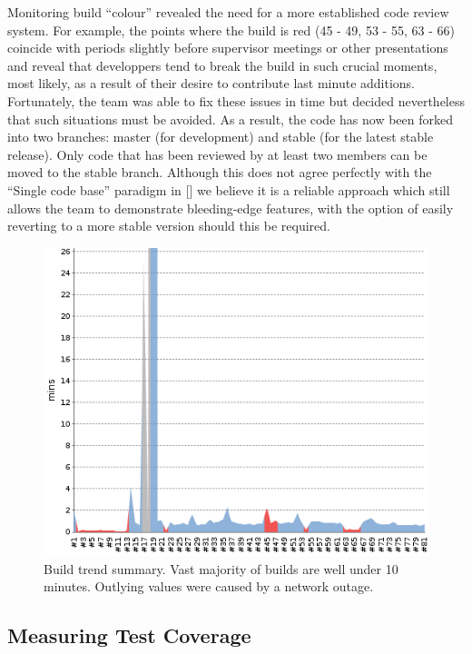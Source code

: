 \documentclass[10pt]{article}
\begin{document}
Monitoring build ``colour'' revealed the need for a more established code review system. For example, the points where the build is red (45 - 49, 53 - 55, 63 - 66) coincide with periods slightly before supervisor meetings or other presentations and reveal that developpers tend to break the build in such crucial moments, most likely, as a result of their desire to contribute last minute additions. Fortunately, the team was able to fix these issues in time but decided nevertheless that such situations must be avoided. As a result, the code has now been forked into two branches: master (for development) and stable (for the latest stable release). Only code that has been reviewed by at least two members can be moved to the stable branch. Although this does not agree perfectly with the ``Single code base'' paradigm in [] we believe it is a reliable approach which still allows the team to demonstrate bleeding-edge features, with the option of easily reverting to a more stable version should this be required.

\begin{figure}[ht]
\centering
\label{pic-buildtime}
\includegraphics[bb=0 0 500 400, scale = 0.6]{build-trend.png}
\caption{Build trend summary. Vast majority of builds are well under 10 minutes. Outlying values were caused by a network outage.}
\end{figure}

\subsection{Measuring Test Coverage}
\end{document}
